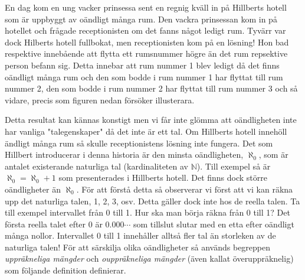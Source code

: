 \documentclass{article}
\theoremstyle{definition}
\begin{document}
En dag kom en ung vacker prinsessa sent en regnig kväll in på Hillberts hotell som är uppbyggt av oändligt många rum.
Den vackra prinsessan kom in på hotellet och frågade receptionisten om det fanns något ledigt rum. Tyvärr var dock Hilberts hotell fullbokat, 
men receptionisten kom på en lösning! Hon bad respektive innebående att flytta ett rumsnummer högre än det rum repsektive person befann sig. 
Detta innebar att rum nummer 1 blev ledigt då det finns oändligt många rum
och den som bodde i rum nummer 1 har flyttat till rum nummer 2, den som bodde i rum nummer 2 har flyttat till rum nummer 3
och så vidare, precis som figuren nedan försöker illusterara.  

\begin{center}
\end{center}

Detta resultat kan kännas konstigt men vi får inte glömma att oändligheten inte har vanliga "talegenskaper" då det inte är ett tal. 
Om Hillberts hotell innehöll ändligt många rum så skulle receptionistens lösning inte fungera. Det som Hillbert introducerar i 
denna historia är den minsta oändligheten, $\aleph_0$, som är antalet existerande naturliga tal (kardinaliteten av $\mathbb{N}$). 
Till exempel så är $\aleph_0 = \aleph_0 + 1$ som presenterades i Hillberts hotell. Det finns dock större oändligheter än $\aleph_0$. 
För att förstå detta så observerar vi först att vi kan räkna upp det naturliga talen, 1, 2, 3, osv. Detta gäller dock inte hos de reella talen. 
Ta till exempel intervallet från 0 till 1. Hur ska man börja räkna från 0 till 1? Det första reella talet efter 0 är $0.000\cdots$ som 
tillslut slutar med en etta efter oändligt många nollor. Intervallet 0 till 1 innehåller alltså fler tal än
storleken av de naturliga talen! För att särskilja olika oändligheter så används begreppen \textit{uppräkneliga mängder} och \textit{ouppräkneliga mängder}
(även kallat överuppräknelig) som följande definition definierar.
\end{document}
